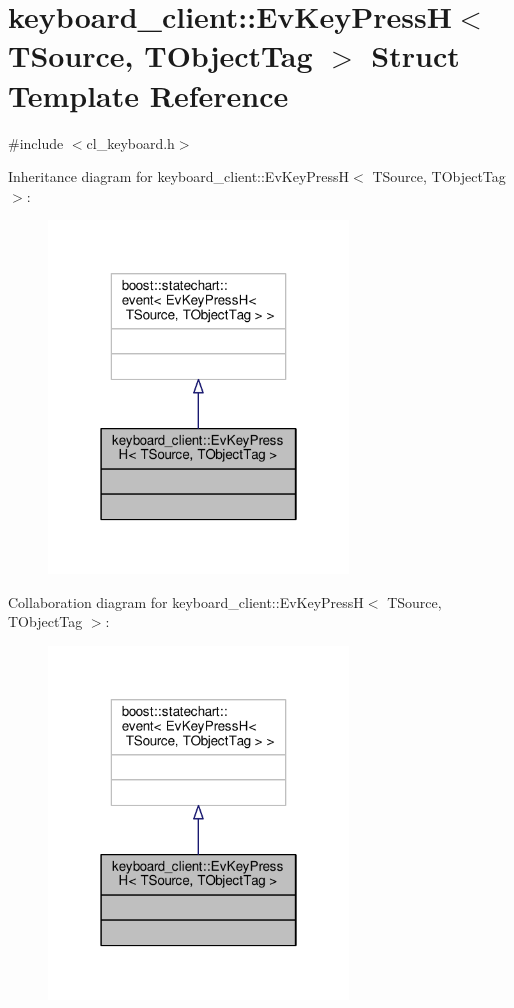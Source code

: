 \hypertarget{structkeyboard__client_1_1EvKeyPressH}{}\section{keyboard\+\_\+client\+:\+:Ev\+Key\+PressH$<$ T\+Source, T\+Object\+Tag $>$ Struct Template Reference}
\label{structkeyboard__client_1_1EvKeyPressH}


{\ttfamily \#include $<$cl\+\_\+keyboard.\+h$>$}



Inheritance diagram for keyboard\+\_\+client\+:\+:Ev\+Key\+PressH$<$ T\+Source, T\+Object\+Tag $>$\+:\nopagebreak
\begin{figure}[H]
\begin{center}
\leavevmode
\includegraphics[width=226pt]{structkeyboard__client_1_1EvKeyPressH__inherit__graph}
\end{center}
\end{figure}


Collaboration diagram for keyboard\+\_\+client\+:\+:Ev\+Key\+PressH$<$ T\+Source, T\+Object\+Tag $>$\+:\nopagebreak
\begin{figure}[H]
\begin{center}
\leavevmode
\includegraphics[width=226pt]{structkeyboard__client_1_1EvKeyPressH__coll__graph}
\end{center}
\end{figure}


